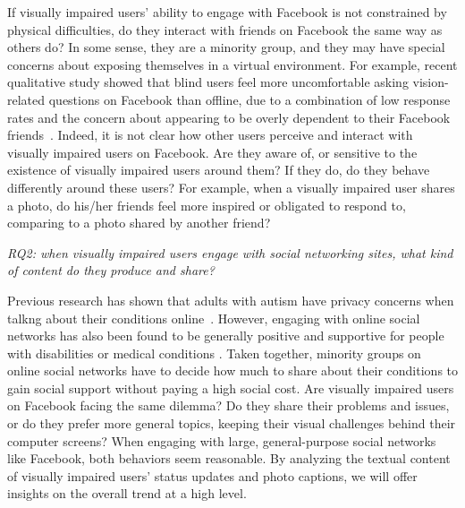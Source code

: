 \documentclass{sigchi}
\begin{document}


If visually impaired users' ability to engage with Facebook is not constrained by physical difficulties, do they interact with friends on Facebook the same way as others do? In some sense, they are a minority group, and they may have special concerns about exposing themselves in a virtual environment. For example, recent qualitative study showed that blind users feel more uncomfortable asking vision-related questions on Facebook than offline, due to a combination of low response rates and the concern about appearing to be overly dependent to their Facebook friends~\cite{brady2013cscw}. Indeed, it is not clear how other users perceive and interact with visually impaired users on Facebook. Are they aware of, or sensitive to the existence of visually impaired users around them? If they do, do they behave differently around these users? For example, when a visually impaired user shares a photo, do his/her friends feel more inspired or obligated to respond to, comparing to a photo shared by another friend? 


\emph{RQ2: when visually impaired users engage with social networking sites, what kind of content do they produce and share? }

Previous research has shown that adults with autism have privacy concerns when talkng about their conditions online~\cite{burke:2010}. However, engaging with online social networks has also been found to be generally positive and supportive for people with disabilities or medical conditions \cite{burke:2010,tsaousides2011}. Taken together, minority groups on online social networks have to decide how much to share about their conditions to gain social support without paying a high social cost. Are visually impaired users on Facebook facing the same dilemma?  Do they share their problems and issues, or do they prefer more general topics, keeping their visual challenges behind their computer screens? When engaging with large, general-purpose social networks like Facebook, both behaviors seem reasonable. By analyzing the textual content of visually impaired users' status updates and photo captions, we will offer insights on the overall trend at a high level.
\end{document}

